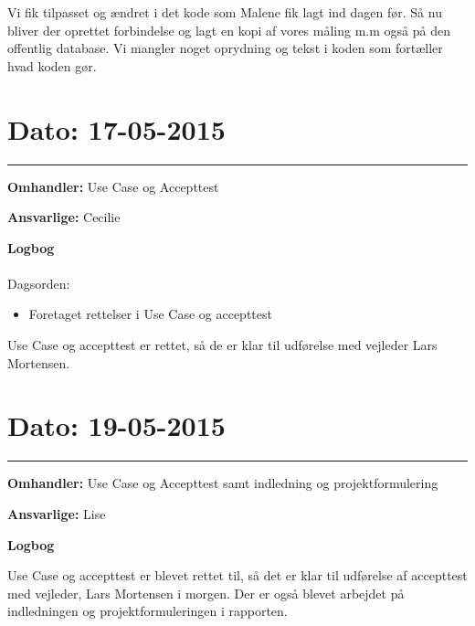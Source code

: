 Vi fik tilpasset og ændret i det kode som Malene fik lagt ind dagen før. Så nu bliver der oprettet forbindelse og lagt en kopi af vores måling m.m også på den offentlig database. Vi mangler noget oprydning og tekst i koden som fortæller hvad koden gør.

\section{Dato: 17-05-2015}
\hrule
\textbf{Omhandler:} Use Case og Accepttest

\textbf{Ansvarlige:} Cecilie

\textbf{Logbog}
\\
\\
Dagsorden:
\begin{itemize}
	\item Foretaget rettelser i Use Case og accepttest
\end{itemize}

Use Case og accepttest er rettet, så de er klar til udførelse med vejleder Lars Mortensen.

\section{Dato: 19-05-2015}
\hrule
\textbf{Omhandler:} Use Case og Accepttest samt indledning og projektformulering

\textbf{Ansvarlige:} Lise 

\textbf{Logbog}

Use Case og accepttest er blevet rettet til, så det er klar til udførelse af accepttest med vejleder, Lars Mortensen i morgen. Der er også blevet arbejdet på indledningen og projektformuleringen i rapporten. 
